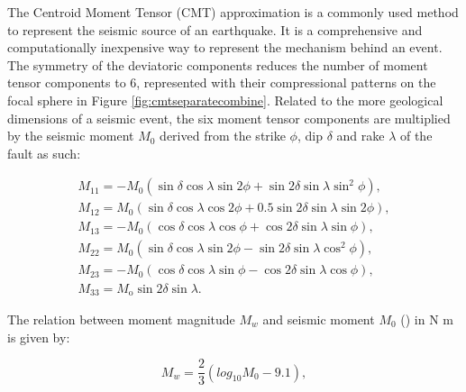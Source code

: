 \documentclass[../Text/00main.tex]{subfiles}
\begin{document}
The Centroid Moment Tensor (CMT) approximation is a commonly used method to represent the seismic source of an earthquake. It is a comprehensive and computationally inexpensive way to represent the mechanism behind an event. The symmetry of the deviatoric components reduces the number of moment tensor components to 6, represented with their compressional patterns on the focal sphere in Figure \ref{fig:cmtseparatecombine}. Related to the more geological dimensions of a seismic event, the six moment tensor components are multiplied by the seismic moment $M_{0}$ derived from the strike $\phi$, dip $\delta$ and rake $\lambda$ of the fault as such:

\begin{equation}
\begin{array}{l}M_{\mathrm{11}}=-M_{0}\left(\sin \delta \cos \lambda \sin 2 \phi+\sin 2 \delta \sin \lambda \sin ^{2} \phi\right) ,\\ M_{\mathrm{12}}=M_{0}(\sin \delta \cos \lambda \cos 2 \phi+0.5 \sin 2 \delta \sin \lambda \sin 2 \phi) ,\\ M_{\mathrm{13}}=-M_{0}(\cos \delta \cos \lambda \cos \phi+\cos 2 \delta \sin \lambda \sin \phi) ,\\ M_{\mathrm{22}}=M_{0}\left(\sin \delta \cos \lambda \sin 2 \phi-\sin 2 \delta \sin \lambda \cos ^{2} \phi\right) ,\\ M_{\mathrm{23}}=-M_{0}(\cos \delta \cos \lambda \sin \phi-\cos 2 \delta \sin \lambda \cos \phi) ,\\ M_{\mathrm{33}}=M_{\mathrm{o}} \sin 2 \delta \sin \lambda.
\end{array}
\end{equation}

The relation between moment magnitude $M_w$ and seismic moment $M_0$ (\cite{hanks1979moment}) in N m is given by:

\begin{equation}
    M_w = \frac{2}{3}(log_{10} M_0 - 9.1),
\end{equation} 
\end{document}
